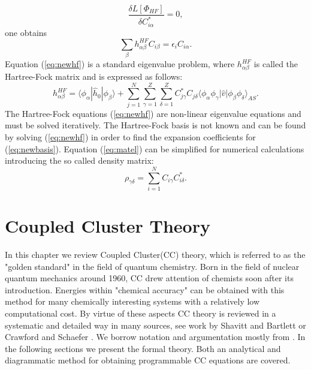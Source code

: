 \documentclass[twoside,english]{uiofysmaster}
\begin{document}
\begin{equation}
\frac {\delta L[\Phi_{HF}]}{\delta C^*_{i\alpha}} = 0,
\end{equation}
one obtains
\begin{equation}
\sum_{\beta}h_{\alpha\beta}^{HF}C_{i\beta}=\epsilon_iC_{i\alpha}. \label{eq:newhf}
\end{equation}
Equation (\ref{eq:newhf}) is a standard eigenvalue problem, where $h_{\alpha\beta}^{HF}$ is called the Hartree-Fock matrix and is expressed as follows:
\begin{equation}\label{eq:matel}
h_{\alpha\beta}^{HF}=\langle \phi_{\alpha} | \hat{h}_0 | \phi_{\beta} \rangle+
\sum_{j=1}^N\sum_{\gamma=1}^Z\sum_{\delta=1}^Z C^*_{j\gamma}C_{j\delta}\langle \phi_{\alpha}\phi_{\gamma}|\hat{v}|\phi_{\beta}\phi_{\delta}\rangle_{AS}.
\end{equation}
The Hartree-Fock equations (\ref{eq:newhf}) are non-linear eigenvalue equations and must be solved iteratively.
The Hartree-Fock basis is not known and can be found by solving (\ref{eq:newhf}) in order to find the expansion coefficients for (\ref{eq:newbasis}).
Equation (\ref{eq:matel}) can be simplified for numerical calculations introducing the so called density matrix:
\begin{equation}
\rho_{\gamma\delta} = \sum_{i=1}^{N}C_{i\gamma}C^*_{i\delta}.
\label{_auto10}
\end{equation}


\chapter{Coupled Cluster Theory}\label{CCchapter}


In this chapter we review Coupled Cluster(CC) theory, which is referred to as the "golden standard" in the field of quantum chemistry. Born in the field of nuclear quantum mechanics around 1960, CC drew attention of chemists soon after its introduction. Energies within "chemical accuracy" can be obtained with this method for many chemically interesting systems with a relatively low computational cost. By virtue of these aspects CC theory is reviewed in a systematic and detailed way in many sources, see work by Shavitt and Bartlett \cite{ShavittManybodymethodschemistry2009} or Crawford and Schaefer \cite{CrawfordIntroductionCoupledCluster2007}.
We borrow notation and argumentation mostly from \cite{CrawfordIntroductionCoupledCluster2007}. In the following sections we present the formal theory.
Both an analytical and diagrammatic method for obtaining programmable CC equations are covered.
\end{document}
